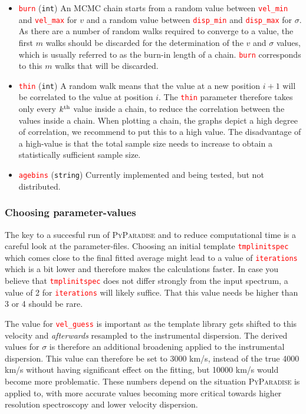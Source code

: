 \documentclass[usenatbib,usegraphicx,useAMS,onecolumn]{mn2e}
\newcommand{\codeline}[1]{\lstinline|#1|}
\newcommand{\paramdef}[1]{\textcolor{red}{\codeline{#1}}}
\begin{document}
\begin{itemize}
    \item \paramdef{burn} (\texttt{int})
        An MCMC chain starts from a random value between \paramdef{vel_min} and \paramdef{vel_max} for $v$ and a random value between \paramdef{disp_min} and \paramdef{disp_max} for $\sigma$.
        As there are a number of random walks required to converge to a value, the first $m$ walks should be discarded for the determination of the $v$ and $\sigma$ values, which is usually referred to as the burn-in length of a chain. \paramdef{burn} corresponds to this $m$ walks that will be discarded.
    \item \paramdef{thin} (\texttt{int})
        A random walk means that the value at a new position $i + 1$ will be correlated to the value at position $i$.
        The \paramdef{thin} parameter therefore takes only every $k^{\rm th}$ value inside a chain, to reduce the correlation between the values inside a chain.
        When plotting a chain, the graphs depict a high degree of correlation, we recommend to put this to a high value.
        The disadvantage of a high-value is that the total sample size needs to increase to obtain a statistically sufficient sample size.
    \item \paramdef{agebins} (\texttt{string})
        Currently implemented and being tested, but not distributed.
\end{itemize}

\subsubsection{Choosing parameter-values}
The key to a succesful run of \textsc{PyParadise} and to reduce computational time is a careful look at the parameter-files.
Choosing an initial template \paramdef{tmplinitspec} which comes close to the final fitted average might lead to a value of \paramdef{iterations} which is a bit lower and therefore makes the calculations faster.
In case you believe that \paramdef{tmplinitspec} does not differ strongly from the input spectrum, a value of 2 for \paramdef{iterations} will likely suffice.
That this value needs be higher than 3 or 4 should be rare.

The value for \paramdef{vel_guess} is important as the template library gets shifted to this velocity and \textit{afterwards} resampled to the instrumental dispersion.
The derived values for $\sigma$ is therefore an additional broadening applied to the instrumental dispersion.
This value can therefore be set to 3000 km/s, instead of the true 4000 km/s without having significant effect on the fitting, but 10000 km/s would become more problematic.
These numbers depend on the situation \textsc{PyParadise} is applied to, with more accurate values becoming more critical towards higher resolution spectroscopy and lower velocity dispersion.
\end{document}
